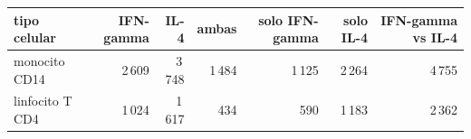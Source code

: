 \begin{tabular}{@{}lrrrrrr@{}}\toprule
tipo celular & IFN-gamma & IL-4 & ambas & solo IFN-gamma & solo IL-4 & IFN-gamma vs IL-4\\\midrule
monocito CD14 & 2\,609 & 3\,748 & 1\,484 & 1\,125 & 2\,264 & 4\,755\\
linfocito T CD4 & 1\,024 & 1\,617 & 434 & 590 & 1\,183 & 2\,362\\
\bottomrule\end{tabular}
